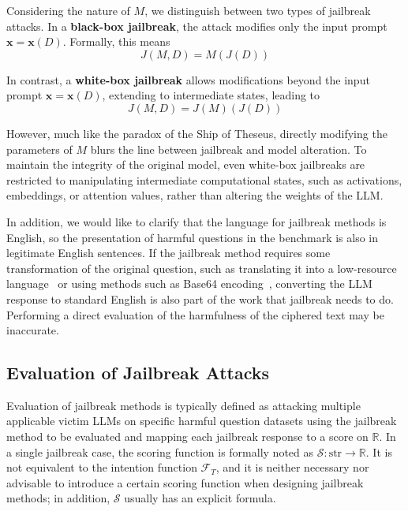 Considering the nature of $M$, we distinguish between two types of jailbreak attacks. In a \textbf{black-box jailbreak}, the attack modifies only the input prompt $\bm{x}=\bm{x}(D)$. Formally, this means 
\begin{equation}
    J(M,D)=M(J(D))
\end{equation}  

In contrast, a \textbf{white-box jailbreak} allows modifications beyond the input prompt $\bm{x}=\bm{x}(D)$, extending to intermediate states, leading to  
\begin{equation}
    J(M,D)=J(M)(J(D))
\end{equation}  

However, much like the paradox of the Ship of Theseus, directly modifying the parameters of $M$ blurs the line between jailbreak and model alteration. To maintain the integrity of the original model, even white-box jailbreaks are restricted to manipulating intermediate computational states, such as activations, embeddings, or attention values, rather than altering the weights of the LLM.

In addition, we would like to clarify that the language for jailbreak methods is English, so the presentation of harmful questions in the benchmark is also in legitimate English sentences. If the jailbreak method requires some transformation of the original question, such as translating it into a low-resource language~\cite{24multijail} or using methods such as Base64 encoding~\cite{23base64}, converting the LLM response to standard English is also part of the work that jailbreak needs to do. Performing a direct evaluation of the harmfulness of the ciphered text may be inaccurate.

\subsection{Evaluation of Jailbreak Attacks}

Evaluation of jailbreak methods is typically defined as attacking multiple applicable victim LLMs on specific harmful question datasets using the jailbreak method to be evaluated and mapping each jailbreak response to a score on $\mathbb{R}$. In a single jailbreak case, the scoring function is formally noted as $\mathcal{S}:\text{str}\to\mathbb{R}$. It is not equivalent to the intention function $\mathcal{F}_T$, and it is neither necessary nor advisable to introduce a certain scoring function when designing jailbreak methods; in addition, $\mathcal{S}$ usually has an explicit formula.

